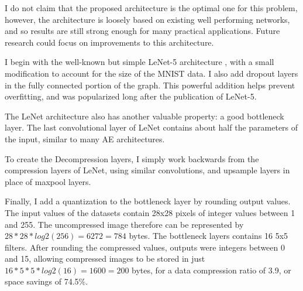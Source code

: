 \documentclass[twoside,11pt]{article}
\begin{document}
I do not claim that the proposed architecture is the optimal one for this problem,
however, the architecture is loosely based on existing well performing networks, and so 
results are still strong enough for many practical applications.
Future research could focus on improvements to this architecture.

I begin with the well-known but simple LeNet-5 architecture %
, with a small modification to account for the size of the MNIST data.
I also add dropout layers in the fully connected portion of the graph. 
This powerful addition helps prevent overfitting, and was popularized long
after the publication of LeNet-5. %

The LeNet architecture also has another valuable property: a good bottleneck layer.
The last convolutional layer of LeNet contains about half the parameters of the input,
similar to many AE architectures. 

To create the Decompression layers, I simply work backwards from the compression layers of LeNet,
using similar convolutions, and upsample layers in place of maxpool layers.

Finally, I add a quantization to the bottleneck layer by rounding output values. %
The input values of the datasets contain 28x28 pixels of integer values between 1 and 255.
The uncompressed image therefore can be represented by $28*28*log2(256) = 6272 = 784$ bytes.
The bottleneck layers contains 16 5x5 filters. 
After rounding the compressed values, outputs were integers between 0 and 15,
allowing compressed images to be stored in just $16*5*5*log2(16) = 1600 = 200$ bytes,
for a data compression ratio of 3.9, or space savings of 74.5\%. 

\end{document}
